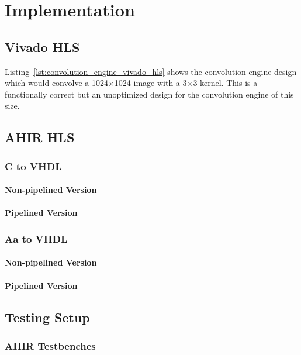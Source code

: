 \chapter{Implementation}

\section{Vivado HLS}

Listing~\ref{lst:convolution_engine_vivado_hls} shows the convolution engine design which would convolve a 1024$\times$1024 image with a
3$\times$3 kernel. This is a functionally correct but an unoptimized design for the convolution engine of this size.



\section{AHIR HLS}

\subsection{C to VHDL}
\subsubsection{Non-pipelined Version}

\subsubsection{Pipelined Version}

\subsection{Aa to VHDL}
\subsubsection{Non-pipelined Version}

\subsubsection{Pipelined Version}

\section{Testing Setup}

\subsection{AHIR Testbenches}

